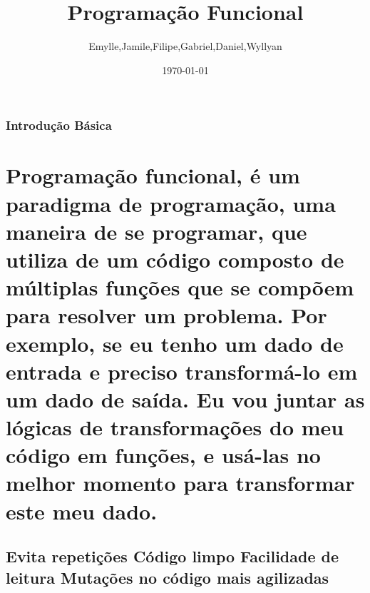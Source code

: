 \documentclass{beamer}
\title[Programação Funcional]{Programação Funcional } %
\author{Emylle,Jamile,Filipe,Gabriel,Daniel,Wyllyan} %
\institute[UCLA] %
{
IFAL - Instituto Federal de Alagoas     \\
\medskip
\textit{} %
}
\date{\today} %
\begin{document}
\begin{frame}
\titlepage %
\end{frame}

\begin{frame}
\frametitle{Introdução Básica} %
\tableofcontents %
\end{frame}


\section{Programação funcional, é um paradigma de programação, uma maneira de se programar, que utiliza de um código composto de múltiplas funções que se compõem para resolver um problema. Por exemplo, se eu tenho um dado de entrada e preciso transformá-lo em um dado de saída. Eu vou juntar as lógicas de transformações do meu código em funções, e usá-las no melhor momento para transformar este meu dado. } %

\subsection{ Evita repetições \newline Código limpo  
\newline Facilidade de leitura 
\newline Mutações no código mais agilizadas
} %
\end{document}
